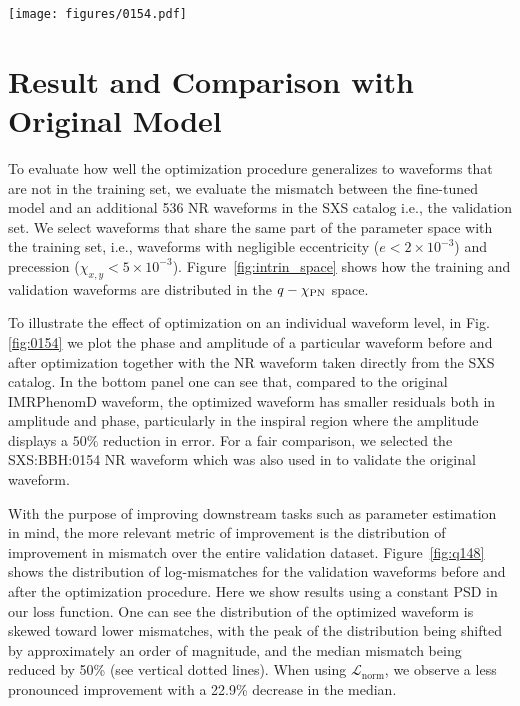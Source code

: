 \documentclass[twocolumn]{aastex631}
\begin{document}
\begin{figure*}[t]
	\centering
	\texttt{[image: figures/0154.pdf]}
	\caption{Comparison between original and optimized IMRPhenomD waveforms.
	Here we show the SXS:BBH:0154 NR waveform, which has a mass ratio of $q=1$ and spins
	$\chi_1=\chi_2=-0.8$. The original mismatch is $2.8\times10^{-4}$ and
	the optimized mismatch is $5.3\times10^{-5}$. \textit{Top}: Here we show the
	amplitude (left) and phase (right) of the NR, original IMRPhenomD, and optimized IMRPhenomD
	waveform. \textit{Bottom}: Here we show the relative error between the NR and
	IMRPhenomD waveform ampltiudes (left) as well as the absolute error of the phases between the NR and
	IMRPhenomD waveforms (right).}
	\label{fig:0154}
\end{figure*}

\section{Result and Comparison with Original Model} \label{sec:result}


To evaluate how well the optimization procedure generalizes to waveforms that are
not in the training set, we evaluate the mismatch between the fine-tuned model
and an additional 536 NR waveforms in the SXS catalog i.e., the validation set.
We select waveforms that share the same part of the parameter space with the training
set, i.e., waveforms with negligible eccentricity (${e<2\times10^{-3}}$)
and precession (${\chi_{x,y}<5\times10^{-3}}$). Figure~\ref{fig:intrin_space}
shows how the training and validation waveforms are distributed in the
$q-\chi_{\rm PN}$ space.

To illustrate the effect of optimization on an individual waveform level, in Fig.
\ref{fig:0154} we plot the phase and amplitude of a particular waveform before and after optimization together with
the NR waveform taken directly from the SXS catalog. In the bottom panel one can see that,
compared to the original IMRPhenomD waveform, the optimized waveform has smaller residuals both in amplitude and
phase, particularly in the inspiral region where the amplitude displays a
$50\%$ reduction in error. For a fair comparison, we selected the SXS:BBH:0154 NR waveform
which was also used in \citep{khan2016frequency} to validate the original waveform.

With the purpose of improving downstream tasks such as parameter estimation in
mind, the more relevant metric of improvement is the distribution of improvement
in mismatch over the entire validation dataset. Figure~\ref{fig:q148} shows the
distribution of log-mismatches for the validation waveforms before and after the
optimization procedure. Here we show results using a constant PSD in our loss
function. One can see the distribution of the optimized waveform is skewed toward lower mismatches,
with the peak of the distribution being shifted by approximately an order of
magnitude, and the median mismatch being reduced by 50\% (see vertical dotted lines). When using
$\mathcal{L}_{\mathrm{norm}}$, we observe a less pronounced improvement with a 22.9\%
decrease in the median. 
\end{document}
